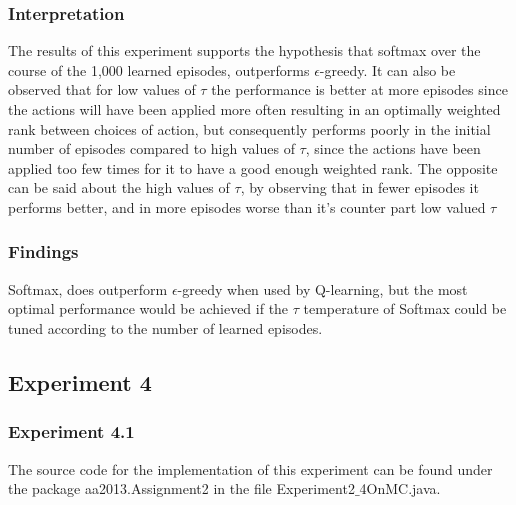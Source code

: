 \documentclass[11pt]{article}
\begin{document}
\subsubsection{Interpretation}
The results of this experiment supports the hypothesis that softmax over the course of the 1,000 learned episodes, outperforms $\epsilon$-greedy. It can also be observed that for low values of $\tau$ the performance is better at more episodes since the actions will have been applied more often resulting in an optimally weighted rank between choices of action, but consequently performs poorly in the initial number of episodes compared to high values of $\tau$, since the actions have been applied too few times for it to have a good enough weighted rank. The opposite can be said about the high values of $\tau$, by observing that in fewer episodes it performs better, and in more episodes worse than it's counter part low valued $\tau$

\subsubsection{Findings}
Softmax, does outperform $\epsilon$-greedy when used by Q-learning, but the most optimal performance would be achieved if the $\tau$ temperature of Softmax could be tuned according to the number of learned episodes.

\subsubsection{}

\subsection{Experiment 4}



\subsubsection{Experiment 4.1}
The source code for the implementation of this experiment can be found under the package aa2013.Assignment2 in the file Experiment2$\_$4OnMC.java.
\end{document}
